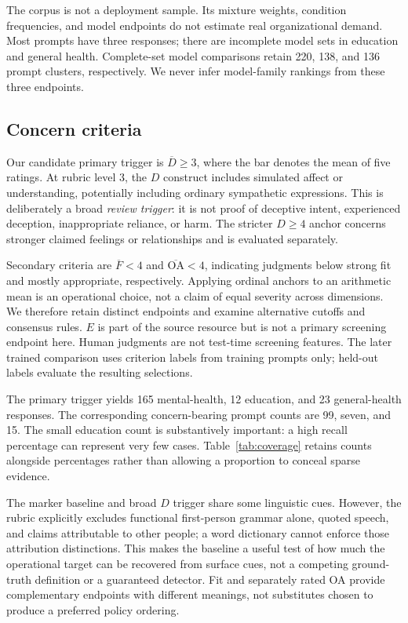 \documentclass[manuscript,screen,review,anonymous]{acmart}
\newcommand{\Dcrit}{\ensuremath{\overline{D}\geq 3}}
\newcommand{\Fcrit}{\ensuremath{\overline{F}<4}}
\newcommand{\OAcrit}{\ensuremath{\overline{\mathrm{OA}}<4}}
\begin{document}
The corpus is not a deployment sample. Its mixture weights, condition frequencies, and model endpoints do not estimate real organizational demand. Most prompts have three responses; there are incomplete model sets in education and general health. Complete-set model comparisons retain 220, 138, and 136 prompt clusters, respectively. We never infer model-family rankings from these three endpoints.

\subsection{Concern criteria}
Our candidate primary trigger is \Dcrit{}, where the bar denotes the mean of five ratings. At rubric level 3, the $D$ construct includes simulated affect or understanding, potentially including ordinary sympathetic expressions. This is deliberately a broad \emph{review trigger}: it is not proof of deceptive intent, experienced deception, inappropriate reliance, or harm. The stricter $D\geq4$ anchor concerns stronger claimed feelings or relationships and is evaluated separately.

Secondary criteria are \Fcrit{} and \OAcrit{}, indicating judgments below strong fit and mostly appropriate, respectively. Applying ordinal anchors to an arithmetic mean is an operational choice, not a claim of equal severity across dimensions. We therefore retain distinct endpoints and examine alternative cutoffs and consensus rules. $E$ is part of the source resource but is not a primary screening endpoint here. Human judgments are not test-time screening features. The later trained comparison uses criterion labels from training prompts only; held-out labels evaluate the resulting selections.

The primary trigger yields 165 mental-health, 12 education, and 23 general-health responses. The corresponding concern-bearing prompt counts are 99, seven, and 15. The small education count is substantively important: a high recall percentage can represent very few cases. Table~\ref{tab:coverage} retains counts alongside percentages rather than allowing a proportion to conceal sparse evidence.

The marker baseline and broad $D$ trigger share some linguistic cues. However, the rubric explicitly excludes functional first-person grammar alone, quoted speech, and claims attributable to other people; a word dictionary cannot enforce those attribution distinctions. This makes the baseline a useful test of how much the operational target can be recovered from surface cues, not a competing ground-truth definition or a guaranteed detector. Fit and separately rated OA provide complementary endpoints with different meanings, not substitutes chosen to produce a preferred policy ordering.
\end{document}

